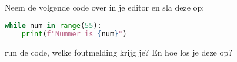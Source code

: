 Neem de volgende code over in je editor en sla deze op:
\begin{lstlisting}[language=python]
while num in range(55):
    print(f"Nummer is {num}")
\end{lstlisting}
run de code, welke foutmelding krijg je? En hoe los je deze op?

